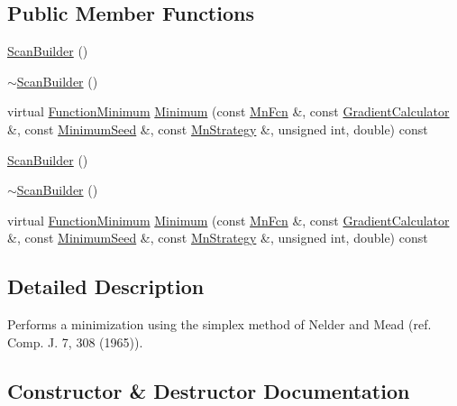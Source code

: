 \subsection*{Public Member Functions}
\begin{DoxyCompactItemize}
\item 
\mbox{\hyperlink{classROOT_1_1Minuit2_1_1ScanBuilder_a8fd7b342f53a78d0e5f7f086df93709e}{Scan\+Builder}} ()
\item 
\mbox{\hyperlink{classROOT_1_1Minuit2_1_1ScanBuilder_a9255e1e6791d3b627872e285b0a7156c}{$\sim$\+Scan\+Builder}} ()
\item 
virtual \mbox{\hyperlink{classROOT_1_1Minuit2_1_1FunctionMinimum}{Function\+Minimum}} \mbox{\hyperlink{classROOT_1_1Minuit2_1_1ScanBuilder_ad53e9711dc8a63958845ac6e6eb5250f}{Minimum}} (const \mbox{\hyperlink{classROOT_1_1Minuit2_1_1MnFcn}{Mn\+Fcn}} \&, const \mbox{\hyperlink{classROOT_1_1Minuit2_1_1GradientCalculator}{Gradient\+Calculator}} \&, const \mbox{\hyperlink{classROOT_1_1Minuit2_1_1MinimumSeed}{Minimum\+Seed}} \&, const \mbox{\hyperlink{classROOT_1_1Minuit2_1_1MnStrategy}{Mn\+Strategy}} \&, unsigned int, double) const
\item 
\mbox{\hyperlink{classROOT_1_1Minuit2_1_1ScanBuilder_a8fd7b342f53a78d0e5f7f086df93709e}{Scan\+Builder}} ()
\item 
\mbox{\hyperlink{classROOT_1_1Minuit2_1_1ScanBuilder_a9255e1e6791d3b627872e285b0a7156c}{$\sim$\+Scan\+Builder}} ()
\item 
virtual \mbox{\hyperlink{classROOT_1_1Minuit2_1_1FunctionMinimum}{Function\+Minimum}} \mbox{\hyperlink{classROOT_1_1Minuit2_1_1ScanBuilder_a24547691823b9f0977e6b23b6d084e7a}{Minimum}} (const \mbox{\hyperlink{classROOT_1_1Minuit2_1_1MnFcn}{Mn\+Fcn}} \&, const \mbox{\hyperlink{classROOT_1_1Minuit2_1_1GradientCalculator}{Gradient\+Calculator}} \&, const \mbox{\hyperlink{classROOT_1_1Minuit2_1_1MinimumSeed}{Minimum\+Seed}} \&, const \mbox{\hyperlink{classROOT_1_1Minuit2_1_1MnStrategy}{Mn\+Strategy}} \&, unsigned int, double) const
\end{DoxyCompactItemize}


\subsection{Detailed Description}
Performs a minimization using the simplex method of Nelder and Mead (ref. Comp. J. 7, 308 (1965)). 

\subsection{Constructor \& Destructor Documentation}
\mbox{\label{classROOT_1_1Minuit2_1_1ScanBuilder_a8fd7b342f53a78d0e5f7f086df93709e}} 
